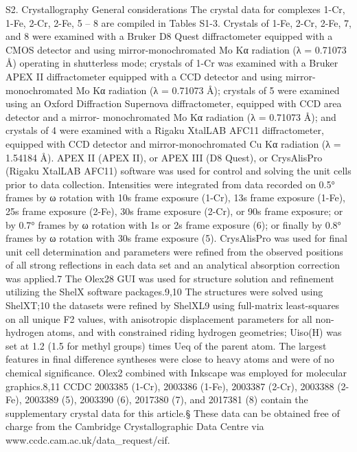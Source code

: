  
S2. Crystallography 
General considerations 
The crystal data for complexes 1-Cr, 1-Fe, 2-Cr, 2-Fe, 5 – 8 are compiled in Tables S1-3. Crystals of 1-Fe, 2-Cr, 2-Fe, 7, and 
8 were examined with a Bruker D8 Quest diffractometer equipped with a CMOS detector and using mirror-monochromated 
Mo Kα radiation (λ = 0.71073 Å) operating in shutterless mode; crystals of 1-Cr was examined with a Bruker APEX II 
diffractometer equipped with a CCD detector and using mirror-monochromated Mo Kα radiation (λ = 0.71073 Å); crystals of 
5 were examined using an Oxford Diffraction Supernova diffractometer, equipped with CCD area detector and a mirror-
monochromated Mo Kα radiation (λ = 0.71073 Å); and crystals of 4 were examined with a Rigaku XtalLAB AFC11 
diffractometer, equipped with CCD detector and mirror-monochromated Cu Kα radiation (λ = 1.54184 Å). APEX II (APEX 
II), or APEX III (D8 Quest), or CrysAlisPro (Rigaku XtalLAB AFC11) software was used for control and solving the unit 
cells prior to data collection. Intensities were integrated from data recorded on 0.5° frames by ω rotation with 10s frame 
exposure (1-Cr), 13s frame exposure (1-Fe), 25s frame exposure (2-Fe), 30s frame exposure (2-Cr), or 90s frame exposure; 
or by 0.7° frames by ω rotation with 1s or 2s frame exposure (6); or finally by 0.8° frames by ω rotation with 30s frame 
exposure (5). CrysAlisPro was used for final unit cell determination and parameters were refined from the observed positions 
of all strong reflections in each data set and an analytical absorption correction was applied.7 The Olex28 GUI was used for 
structure solution and refinement utilizing the ShelX software packages.9,10 The structures were solved using ShelXT;10 the 
datasets were refined by ShelXL9 using full-matrix least-squares on all unique F2 values, with anisotropic displacement 
parameters for all non-hydrogen atoms, and with constrained riding hydrogen geometries; Uiso(H) was set at 1.2 (1.5 for methyl 
groups) times Ueq of the parent atom. The largest features in final difference syntheses were close to heavy atoms and were 
of no chemical significance. Olex2 combined with Inkscape was employed for molecular graphics.8,11 CCDC 2003385 (1-Cr), 
2003386 (1-Fe), 2003387 (2-Cr), 2003388 (2-Fe), 2003389 (5), 2003390 (6), 2017380 (7), and 2017381 (8) contain the 
supplementary crystal data for this article.§ These data can be obtained free of charge from the Cambridge Crystallographic 
Data Centre via www.ccdc.cam.ac.uk/data_request/cif. 
 
 
 
